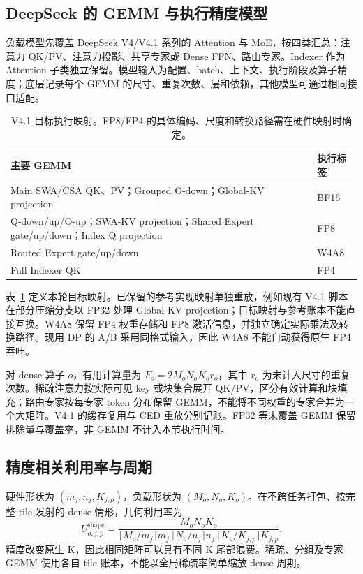 \subsection{DeepSeek 的 GEMM 与执行精度模型}
\label{sec:workload_extraction}

负载模型先覆盖 DeepSeek V4/V4.1 系列的 Attention 与 MoE，按四类汇总：注意力 QK/PV、注意力投影、共享专家或 Dense FFN、路由专家。Indexer 作为 Attention 子类独立保留。模型输入为配置、batch、上下文、执行阶段及算子精度；底层记录每个 GEMM 的尺寸、重复次数、层和依赖，其他模型可通过相同接口适配。

\begin{table}[t]
\centering
\caption{V4.1 目标执行映射。FP8/FP4 的具体编码、尺度和转换路径需在硬件映射时确定。}
\label{tab:deepseek_execution_map}
\footnotesize
\begin{tabular}{@{}p{}p{}@{}}\toprule
主要 GEMM & 执行标签 \\\midrule
Main SWA/CSA QK、PV；Grouped O-down；Global-KV projection & BF16 \\
Q-down/up/O-up；SWA-KV projection；Shared Expert gate/up/down；Index Q projection & FP8 \\
Routed Expert gate/up/down & W4A8 \\
Full Indexer QK & FP4 \\
\bottomrule\end{tabular}
\end{table}

表~\ref{tab:deepseek_execution_map} 定义本轮目标映射。已保留的参考实现映射单独重放，例如现有 V4.1 脚本在部分压缩分支以 FP32 处理 Global-KV projection；目标映射与参考账本不能直接互换。W4A8 保留 FP4 权重存储和 FP8 激活信息，并独立确定实际乘法及转换路径。现用 DP 的 A/B 采用同格式输入，因此 W4A8 不能自动获得原生 FP4 吞吐。

对 dense 算子 $o$，有用计算量为 $F_o=2M_oN_oK_or_o$，其中 $r_o$ 为未计入尺寸的重复次数。稀疏注意力按实际可见 key 或块集合展开 QK/PV，区分有效计算和块填充；路由专家按每专家 token 分布保留 GEMM，不能将不同权重的专家合并为一个大矩阵。V4.1 的缓存复用与 CED 重放分别记账。FP32 等未覆盖 GEMM 保留排除量与覆盖率，非 GEMM 不计入本节执行时间。

\subsection{精度相关利用率与周期}
\label{sec:compute_model}

硬件形状为 $(m_j,n_j,K_{j,p})$，负载形状为 $(M_o,N_o,K_o)$。在不跨任务打包、按完整 tile 发射的 dense 情形，几何利用率为
\begin{equation}
U_{o,j,p}^{\mathrm{shape}}=
\frac{M_oN_oK_o}
{\lceil M_o/m_j\rceil m_j\,
 \lceil N_o/n_j\rceil n_j\,
 \lceil K_o/K_{j,p}\rceil K_{j,p}}.
\label{eq:shape_utilization}
\end{equation}
精度改变原生 K，因此相同矩阵可以具有不同 K 尾部浪费。稀疏、分组及专家 GEMM 使用各自 tile 账本，不能以全局稀疏率简单缩放 dense 周期。

